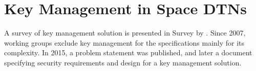 \section{Key Management in Space DTNs}
\label{sec:survey}

A survey of key management solution is presented in Survey by \cite{menesidou2017cryptographic}. 
Since 2007, working groups exclude key management for the specifications mainly for its complexity. In 2015, a problem statement was published, and later a document specifying security requirements and design for a key management solution.

